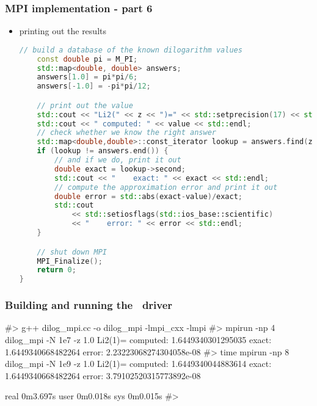 \begin{frame}[fragile]
%
  \frametitle{MPI implementation - part 6}
%
  \begin{itemize}
  \item printing out the results
  \begin{lstlisting}[language=c++,name=mpi]
    // build a database of the known dilogarithm values
    const double pi = M_PI;
    std::map<double, double> answers;
    answers[1.0] = pi*pi/6;
    answers[-1.0] = -pi*pi/12;

    // print out the value
    std::cout << "Li2(" << z << ")=" << std::setprecision(17) << std::endl;
    std::cout << " computed: " << value << std::endl;
    // check whether we know the right answer
    std::map<double,double>::const_iterator lookup = answers.find(z);
    if (lookup != answers.end()) {
        // and if we do, print it out
        double exact = lookup->second;
        std::cout << "    exact: " << exact << std::endl;
        // compute the approximation error and print it out
        double error = std::abs(exact-value)/exact;
        std::cout 
            << std::setiosflags(std::ios_base::scientific) 
            << "    error: " << error << std::endl;
    }

    // shut down MPI
    MPI_Finalize();
    return 0;
}
  \end{lstlisting}
%
  \end{itemize}
%
\end{frame}

\begin{frame}[fragile]
%
  \frametitle{Building and running the \mpi\ driver}
%
  \begin{shell}{}
#> g++ dilog_mpi.cc -o dilog_mpi -lmpi_cxx -lmpi
#> mpirun -np 4 dilog_mpi -N 1e7 -z 1.0
Li2(1)=
 computed: 1.6449340301295035
    exact: 1.6449340668482264
    error: 2.23223068274304058e-08
#> time mpirun -np 8 dilog_mpi -N 1e9 -z 1.0
Li2(1)=
 computed: 1.6449340044883614
    exact: 1.6449340668482264
    error: 3.79102520315773892e-08

real    0m3.697s
user    0m0.018s
sys     0m0.015s
#>
  \end{shell}
%
\end{frame}

